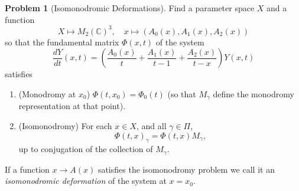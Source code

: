 \documentclass[12pt]{book}
\numberwithin{equation}{section}
\theoremstyle{definition}
\newtheorem{problem}[theorem]{Problem}
\theoremstyle{remark}
\newcommand{\CC}{\mathbb{C}}
\begin{document}
\begin{problem}[Isomonodromic Deformations]
	Find a parameter space $X$ and a function 
	$$X\mapsto M_2(\CC)^3, \quad x\mapsto (A_0(x),A_1(x),A_2(x))$$
	so that the fundamental matrix $\Phi(x,t)$ of the system 
	$$ \dfrac{dY}{dt}(x,t) = \left( \dfrac{A_0(x)}{t} +\dfrac{A_1(x)}{t-1} + \dfrac{A_2(x)}{t-x} \right)Y(x,t) $$
	satisfies
	\begin{enumerate}
		\item (Monodromy at $x_0$) $\Phi(t,x_0) = \Phi_0(t)$ (so that $M_{\gamma}$ define the monodromy representation at that point).
		\item (Isomonodromy) For each $x\in X$, and all $\gamma \in \Pi$, $$\Phi(t,x)_{\gamma} = \Phi(t,x)M_{\gamma},$$
		up to conjugation of the collection of $M_{\gamma}$.
	\end{enumerate}
\end{problem}
 If a function $x\to A(x)$ satisfies the isomonodromy problem we call it an \emph{isomonodromic deformation} of the system at $x=x_0$.
\end{document}
